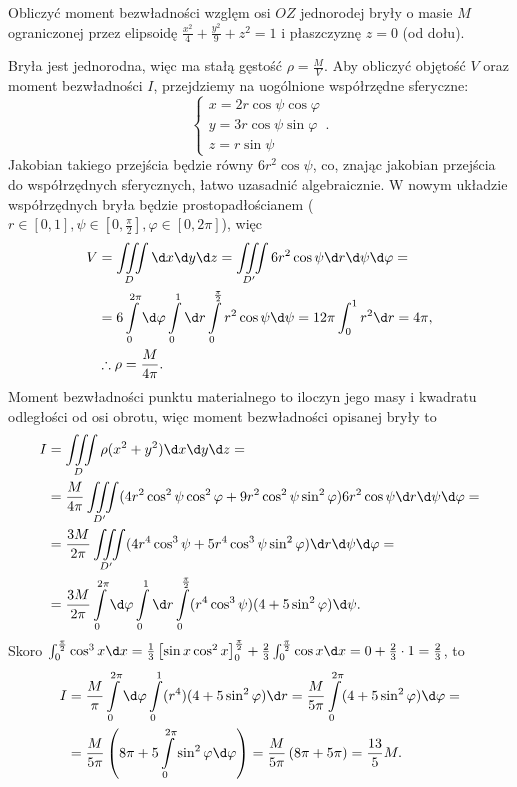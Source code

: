\begin{example}
    Obliczyć moment bezwładności wzglęm osi $OZ$ jednorodej bryły o masie $M$ ograniczonej przez elipsoidę $\frac{x^2}{4} + \frac{y^2}{9} + z^2 = 1$ i płaszczyznę $z = 0$ (od dołu).
\end{example}
\begin{solution}
    Bryła jest jednorodna, więc ma stałą gęstość $\rho = \frac{M}{V}$. Aby obliczyć objętość $V$ oraz moment bezwładności $I$, przejdziemy na uogólnione współrzędne sferyczne:
    \[ \begin{cases}
        x = 2r\cos\psi\cos\varphi \\
        y = 3r\cos\psi\sin\varphi \\
        z = r\sin\psi
    \end{cases}. \]
    Jakobian takiego przejścia będzie równy $6r^2\cos\psi$, co, znając jakobian przejścia do współrzędnych sferycznych, łatwo uzasadnić algebraicznie. W nowym układzie współrzędnych bryła będzie prostopadłościanem ($r \in [0, 1], \psi \in [0, \frac{\pi}{2}], \varphi \in [0, 2\pi]$), więc
    \begin{align*}
        V &= \iiint\limits_D \d x \d y \d z = \iiint\limits_{D'} 6r^2\cos\psi \d r \d \psi \d \varphi = \\
        &= 6 \int\limits_0^{2\pi} \d \varphi \int\limits_0^1 \d r \int\limits_0^{\frac{\pi}{2}} r^2\cos\psi \d \psi = 12\pi \int_0^1 r^2 \d r = 4\pi, \\
        &\therefore \rho = \frac{M}{4\pi}.
    \end{align*}
    Moment bezwładności punktu materialnego to iloczyn jego masy i kwadratu odległości od osi obrotu, więc moment bezwładności opisanej bryły to
    \begin{align*}
        I &= \iiint\limits_D \rho (x^2 + y^2) \d x \d y \d z = \\
        &= \frac{M}{4\pi} \iiint\limits_{D'} (4r^2\cos^2\psi\cos^2\varphi + 9r^2\cos^2\psi\sin^2\varphi) 6r^2\cos\psi \d r \d \psi \d \varphi = \\
        &= \frac{3M}{2\pi} \iiint\limits_{D'} (4r^4\cos^3\psi + 5r^4\cos^3\psi\sin^2\varphi) \d r \d \psi \d \varphi = \\
        &= \frac{3M}{2\pi} \int\limits_0^{2\pi} \d \varphi \int\limits_0^1 \d r \int\limits_0^{\frac{\pi}{2}} (r^4\cos^3\psi)(4 + 5\sin^2\varphi) \d \psi.
    \end{align*}
    Skoro $\int_0^{\frac{\pi}{2}} \cos^3 x \d x = \frac{1}{3}\left[\sin x \cos^2 x\right]_0^{\frac{\pi}{2}} + \frac{2}{3}\int_0^{\frac{\pi}{2}} \cos x \d x = 0 + \frac{2}{3}\cdot 1 = \frac{2}{3}$, to
    \begin{align*}
        I &= \frac{M}{\pi} \int\limits_0^{2\pi} \d \varphi \int\limits_0^1 (r^4)(4 + 5\sin^2\varphi) \d r = \frac{M}{5\pi} \int\limits_0^{2\pi} (4 + 5\sin^2\varphi) \d \varphi = \\
        &= \frac{M}{5\pi}\left(8\pi + 5\int\limits_0^{2\pi} \sin^2 \varphi \d \varphi\right) = \frac{M}{5\pi}\left(8\pi + 5\pi\right) = \frac{13}{5} M.
    \end{align*}
\end{solution}


